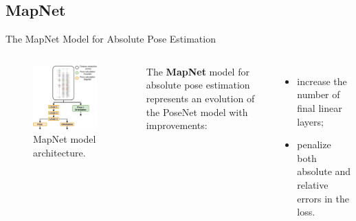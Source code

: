 \documentclass[
    center,
]{beamer}
\begin{document}
\subsection{MapNet}
\begin{frame}{The MapNet Model for Absolute Pose Estimation}
    \begin{columns}
        \begin{figure}
            \centering
            \includegraphics[width=0.9\textwidth]{../imgs/mapnet_posenet_structure.png}
            \caption{MapNet model architecture.}
        \end{figure}

        The \textbf{MapNet} model for absolute pose estimation represents an evolution of the PoseNet model with improvements:
        \begin{itemize}
            \item increase the number of final linear layers;
            \item penalize both absolute and relative errors in the loss.
        \end{itemize}
    \end{columns}
\end{frame}
\end{document}
